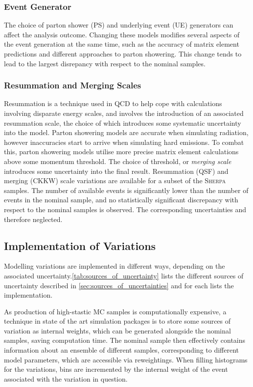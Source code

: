 \subsubsection{Event Generator}

The choice of parton shower (PS) and underlying event (UE) generators can affect the analysis outcome.
Changing these models modifies several aspects of the event generation at the same time, such as the accuracy of matrix element predictions and different approaches to parton showering.
This change tends to lead to the largest disrepancy with respect to the nominal samples.

\subsubsection{Resummation and Merging Scales}

Resummation is a technique used in QCD to help cope with calculations involving disparate energy scales, and involves the introduction of an associated resummation scale, the choice of which introduces some systematic uncertainty into the model.
Parton showering models are accurate when simulating \lowpt radiation, however inaccuracies start to arrive when simulating hard emissions.
To combat this, parton showering models utilise more precise matrix element calculations above some momentum threshold.
The choice of threshold, or \textit{merging scale} introduces some uncertainty into the final result.
Resummation (QSF) and merging (CKKW) scale variations are available for a subset of the \textsc{Sherpa} samples.
The number of available events is significantly lower than the number of events in the nominal sample, and no statistically significant discrepancy with respect to the nominal samples is observed.
The corresponding uncertainties and therefore neglected.

\subsection{Implementation of Variations}\label{sec:implementation_of_variations}

Modelling variations are implemented in different ways, depending on the associated uncertainty.\cref{tab:sources_of_uncertainty} lists the different sources of uncertainty described in \cref{sec:sources_of_uncertainties} and for each lists the implementation.
%

%
As production of high-stastic MC samples is computationally expensive, a technique in state of the art simulation packages is to store some sources of variation as internal weights, which can be generated alongside the nominal samples, saving computation time.
The nominal sample then effectively contains information about an ensemble of different samples, corresponding to different model parameters, which are accessible via reweightings. 
When filling histograms for the variations, bins are incremented by the internal weight of the event associated with the variation in question.

